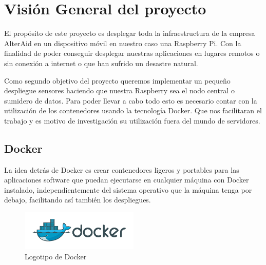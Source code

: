 \chapter{Visión General del proyecto}

El propósito de este proyecto es desplegar toda la infraestructura de la empresa AlterAid en un dispositivo móvil en nuestro caso una Raspberry Pi. Con la finalidad de poder conseguir desplegar nuestras aplicaciones en lugares remotos o sin conexión a internet o que han sufrido un desastre natural.

Como segundo objetivo del proyecto queremos implementar un pequeño despliegue sensores haciendo que nuestra Raspberry sea el nodo central o sumidero de datos. 
Para poder llevar a cabo todo esto es necesario contar con la utilización de los contenedores usando la tecnología Docker. Que nos facilitaran el trabajo y es motivo de investigación su utilización fuera del mundo de servidores.

\section{Docker}

La idea detrás de Docker es crear contenedores ligeros y portables para las aplicaciones software que puedan ejecutarse en cualquier máquina con Docker instalado, independientemente del sistema operativo que la máquina tenga por debajo, facilitando así también los despliegues.

\begin{figure}[htb]
\begin{center}
\includegraphics[width=0.5\textwidth]{./setup/dockerLogo}
\caption{Logotipo de Docker}
\label{F:prova}
\end{center}
\end{figure}


